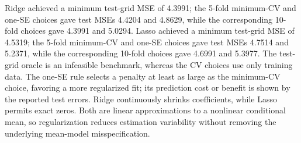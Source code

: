 Ridge achieved a minimum test-grid MSE of 4.3991; the 5-fold minimum-CV and one-SE choices gave test MSEs 4.4204 and 4.8629, while the corresponding 10-fold choices gave 4.3991 and 5.0294. Lasso achieved a minimum test-grid MSE of 4.5319; the 5-fold minimum-CV and one-SE choices gave test MSEs 4.7514 and 5.2371, while the corresponding 10-fold choices gave 4.6991 and 5.3977. The test-grid oracle is an infeasible benchmark, whereas the CV choices use only training data. The one-SE rule selects a penalty at least as large as the minimum-CV choice, favoring a more regularized fit; its prediction cost or benefit is shown by the reported test errors. Ridge continuously shrinks coefficients, while Lasso permits exact zeros. Both are linear approximations to a nonlinear conditional mean, so regularization reduces estimation variability without removing the underlying mean-model misspecification.
